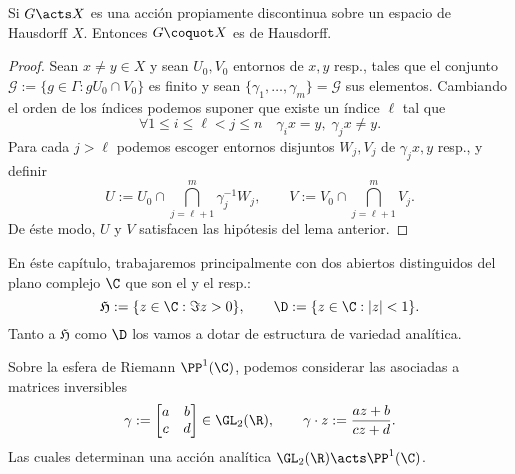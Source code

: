 \documentclass[teoria-numeros.tex]{subfiles}
\begin{document}
\begin{prop}\label{thm:prp_disct_Haus_quot}
	Si $G \acts X$ es una acción propiamente discontinua sobre un espacio de Hausdorff $X$.
	Entonces $G \coquot X$ es de Hausdorff.
\end{prop}
\begin{proof}
	Sean $x \ne y \in X$ y sean $U_0, V_0$ entornos de $x, y$ resp., tales que el conjunto $\mathcal{G} := \{ g \in \Gamma : gU_0 \cap V_0 \}$ es finito
	y sean $\{ \gamma_1, \dots, \gamma_m \} = \mathcal{G}$ sus elementos.
	Cambiando el orden de los índices podemos suponer que existe un índice $\ell$ tal que
	\[
		\forall 1 \le i \le \ell < j \le n \quad \gamma_i x = y, \; \gamma_j x \ne y.
	\]
	Para cada $j > \ell$ podemos escoger entornos disjuntos $W_j, V_j$ de $\gamma_j x, y$ resp., y definir
	\[
		U := U_0 \cap \bigcap_{j=\ell+1}^m \gamma_j^{-1}W_j, \qquad V := V_0 \cap \bigcap_{j=\ell+1}^{m} V_j.
	\]
	De éste modo, $U$ y $V$ satisfacen las hipótesis del lema anterior.
\end{proof}

En éste capítulo, trabajaremos principalmente con dos abiertos distinguidos del plano complejo $\C$ que son el
 y el  resp.:
\[
	\mathfrak{H} := \{ z \in \C : \Im z > 0 \}, \qquad \D := \{ z \in \C : |z| < 1 \}.
\]
Tanto a $\mathfrak{H}$ como $\D$ los vamos a dotar de estructura de variedad analítica.

\begin{mydef}
	Sobre la esfera de Riemann $\PP^1(\C)$, podemos considerar las  asociadas a matrices inversibles
	\[
		\gamma :=
		\begin{bmatrix}
			a & b \\
			c & d
		\end{bmatrix}
		\in \GL_2(\R), \qquad \gamma\cdot z := \frac{az + b}{cz + d}.
	\]
	Las cuales determinan una acción analítica $\GL_2(\R) \acts \PP^1(\C)$.
\end{mydef}
\end{document}
